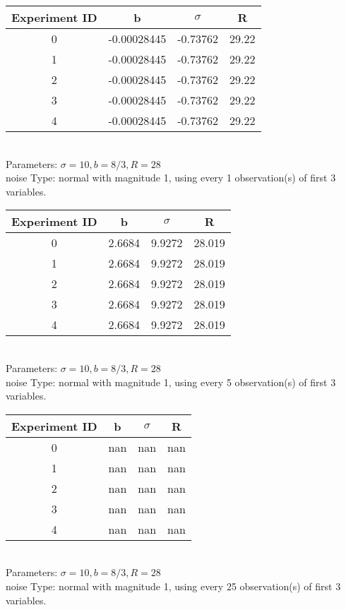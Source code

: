 \begin{multicols}{3}
\begin{tabular}{cccc}
\hline Experiment ID & b & $\sigma$ & R \\ \hline 
0 & -0.00028445 & -0.73762 & 29.22\\ \hline 
 1 & -0.00028445 & -0.73762 & 29.22\\ \hline 
 2 & -0.00028445 & -0.73762 & 29.22\\ \hline 
 3 & -0.00028445 & -0.73762 & 29.22\\ \hline 
 4 & -0.00028445 & -0.73762 & 29.22\\ \hline 
 \end{tabular}\\
Parameters: $\sigma=10, b=8/3, R=28$\\
noise Type: normal with magnitude 1, using every 1 observation(s) of first 3 variables.\\
\begin{tabular}{cccc}
\hline Experiment ID & b & $\sigma$ & R \\ \hline 
0 & 2.6684 & 9.9272 & 28.019\\ \hline 
 1 & 2.6684 & 9.9272 & 28.019\\ \hline 
 2 & 2.6684 & 9.9272 & 28.019\\ \hline 
 3 & 2.6684 & 9.9272 & 28.019\\ \hline 
 4 & 2.6684 & 9.9272 & 28.019\\ \hline 
 \end{tabular}\\
Parameters: $\sigma=10, b=8/3, R=28$\\
noise Type: normal with magnitude 1, using every 5 observation(s) of first 3 variables.\\
\begin{tabular}{cccc}
\hline Experiment ID & b & $\sigma$ & R \\ \hline 
0 & nan & nan & nan\\ \hline 
 1 & nan & nan & nan\\ \hline 
 2 & nan & nan & nan\\ \hline 
 3 & nan & nan & nan\\ \hline 
 4 & nan & nan & nan\\ \hline 
 \end{tabular}\\
Parameters: $\sigma=10, b=8/3, R=28$\\
noise Type: normal with magnitude 1, using every 25 observation(s) of first 3 variables.\\
\begin{tabular}{cccc}

\end{tabular}
\end{multicols}
